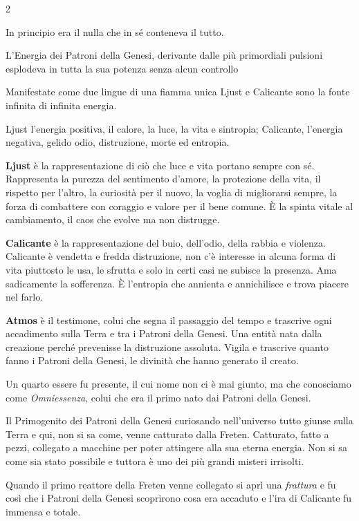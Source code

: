 \begin{multicols}{2}

In principio era il nulla che in sé conteneva il tutto.

L'Energia dei Patroni della Genesi, derivante dalle più primordiali pulsioni esplodeva in tutta la sua potenza senza alcun controllo

Manifestate come due lingue di una fiamma unica Ljust e Calicante sono la fonte infinita di infinita energia.

Ljust l'energia positiva, il calore, la luce, la vita e sintropia; Calicante, l'energia negativa, gelido odio, distruzione, morte ed entropia.

\textbf{Ljust} è la rappresentazione di ciò che luce e vita portano sempre con sé. Rappresenta la purezza del sentimento d'amore, la protezione della vita, il rispetto per l'altro, la curiosità per il nuovo, la voglia di migliorarsi sempre, la forza di combattere con coraggio e valore per il bene comune. È la spinta vitale al cambiamento, il caos che evolve ma non distrugge.

\textbf{Calicante} è la rappresentazione del buio, dell'odio, della rabbia e violenza. Calicante è vendetta e fredda distruzione, non c'è interesse in alcuna forma di vita piuttosto le usa, le sfrutta e solo in certi casi ne subisce la presenza. Ama sadicamente la sofferenza. È l'entropia che annienta e annichilisce e trova piacere nel farlo.

\textbf{Atmos} è il testimone, colui che segna il passaggio del tempo e trascrive ogni accadimento sulla Terra e tra i Patroni della Genesi. Una entità nata dalla creazione perché prevenisse la distruzione assoluta. Vigila e trascrive quanto fanno i Patroni della Genesi, le divinità che hanno generato il creato.

Un quarto essere fu presente, il cui nome non ci è mai giunto, ma che conosciamo come \emph{Omniessenza}, colui che era il primo nato dai Patroni della Genesi.

Il Primogenito dei Patroni della Genesi curiosando nell'universo tutto giunse sulla Terra e qui, non si sa come, venne catturato dalla Freten.
Catturato, fatto a pezzi, collegato a macchine per poter attingere alla sua eterna energia. Non si sa come sia stato possibile e tuttora è uno dei più grandi misteri irrisolti.

Quando il primo reattore della Freten venne collegato si aprì una \emph{frattura} e fu così che i Patroni della Genesi scoprirono cosa era accaduto e l'ira di Calicante fu immensa e totale.


\end{multicols}
